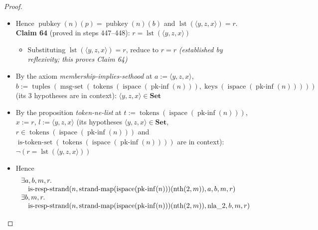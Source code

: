 \documentclass[11pt]{article}
\theoremstyle{plain}
\begin{document}
\begin{proof}
\begin{itemize}[leftmargin=2.8em, itemsep=4pt, parsep=1pt]
\begin{itemize}[leftmargin=2.8em, itemsep=4pt, parsep=1pt]
  \item[\textbf{445--446}] Hence $\operatorname{pubkey}(n)(p) = \operatorname{pubkey}(n)(b)$ and $\operatorname{lst}(\langle y, z, x \rangle) = r$. \textbf{Claim 64} (proved in steps 447--448): $r = \operatorname{lst}(\langle y, z, x \rangle)$
  \begin{itemize}[leftmargin=2.8em, itemsep=4pt, parsep=1pt]
  \item[\textbf{447--448}] Substituting $\operatorname{lst}(\langle y, z, x \rangle) = r$, reduce to $r = r$  \emph{(established by reflexivity; this proves Claim 64)}
  \end{itemize}
  \item[\textbf{449}] By the axiom \emph{membership-implies-sethood} at $a := \langle y, z, x \rangle$, $b := \operatorname{tuples}(\operatorname{msg\text{-}set}(\operatorname{tokens}(\operatorname{ispace}(\operatorname{pk\text{-}inf}(n))), \operatorname{keys}(\operatorname{ispace}(\operatorname{pk\text{-}inf}(n)))))$ (its 3 hypotheses are in context): $\langle y, z, x \rangle \in \mathbf{Set}$
  \item[\textbf{450}] By the proposition \emph{token-ne-list} at $t := \operatorname{tokens}(\operatorname{ispace}(\operatorname{pk\text{-}inf}(n)))$, $x := r$, $l := \langle y, z, x \rangle$ (its hypotheses $\langle y, z, x \rangle \in \mathbf{Set}$, $r \in \operatorname{tokens}(\operatorname{ispace}(\operatorname{pk\text{-}inf}(n)))$ and $\operatorname{is\text{-}token\text{-}set}(\operatorname{tokens}(\operatorname{ispace}(\operatorname{pk\text{-}inf}(n))))$ are in context): $\neg (r = \operatorname{lst}(\langle y, z, x \rangle))$
  \item[\textbf{451--456}] Hence 
\begin{equation*}
\begin{array}{@{}l@{}}
\begin{array}{@{}l@{}} \exists a, b, m, r. \\ \quad \operatorname{is\text{-}resp\text{-}strand}(n, \operatorname{strand\text{-}map}(\operatorname{ispace}(\operatorname{pk\text{-}inf}(n)))(\operatorname{nth}(2, m)), a, b, m, r) \end{array} \\
\begin{array}{@{}l@{}} \exists b, m, r. \\ \quad \operatorname{is\text{-}resp\text{-}strand}(n, \operatorname{strand\text{-}map}(\operatorname{ispace}(\operatorname{pk\text{-}inf}(n)))(\operatorname{nth}(2, m)), \operatorname{nla\_2}, b, m, r) \end{array} \\

\end{array}
\end{equation*}
\end{itemize}
\end{itemize}
\end{proof}
\end{document}
